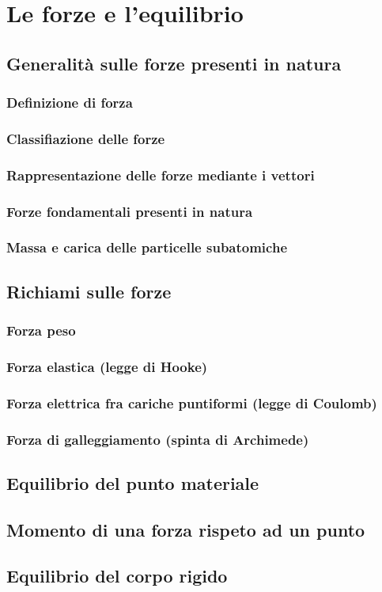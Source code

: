 \section{Le forze e l'equilibrio}
    \subsection{Generalità sulle forze presenti in natura}
        \subsubsection{Definizione di forza}
        \subsubsection{Classifiazione delle forze}
        \subsubsection{Rappresentazione delle forze mediante i vettori}
        \subsubsection{Forze fondamentali presenti in natura}
        \subsubsection{Massa e carica delle particelle subatomiche}
    \subsection{Richiami sulle forze}
        \subsubsection{Forza peso}
        \subsubsection{Forza elastica (legge di Hooke)}\label{par:33forzaElastica}
        \subsubsection{Forza elettrica fra cariche puntiformi (legge di Coulomb)}
        \subsubsection{Forza di galleggiamento (spinta di Archimede)}
    \subsection{Equilibrio del punto materiale}
    \subsection{Momento di una forza rispeto ad un punto}
    \subsection{Equilibrio del corpo rigido}